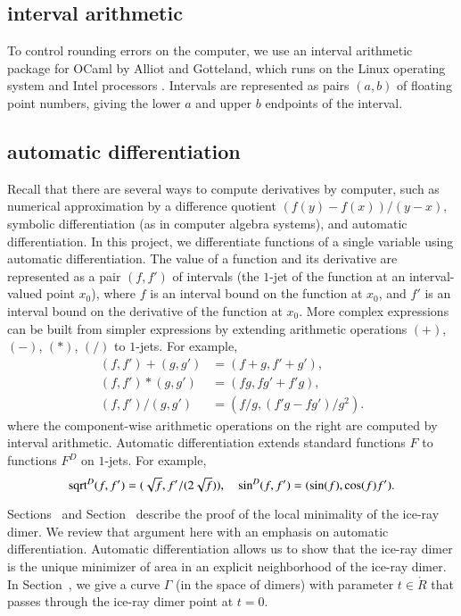 \subsection{interval arithmetic}

To control rounding errors on the computer, we use an interval
arithmetic package for OCaml by Alliot and Gotteland, which runs on
the Linux operating system and Intel processors \cite{All}.  Intervals
are represented as pairs $(a,b)$ of floating point numbers, giving the
lower $a$ and upper $b$ endpoints of the interval.


\subsection{automatic differentiation}

Recall that there are several ways to compute derivatives by computer,
such as numerical approximation by a difference quotient
$(f(y)-f(x))/(y-x)$, symbolic differentiation (as in computer algebra
systems), and automatic differentiation.  In this project, we
differentiate functions of a single variable using automatic
differentiation.  The value of a function and its derivative are
represented as a pair $(f,f')$ of intervals (the $1$-jet of the
function at an interval-valued point $x_0$), where $f$ is an interval
bound on the function at $x_0$, and $f'$ is an interval bound on the
derivative of the function at $x_0$.  More complex expressions can be
built from simpler expressions by extending arithmetic operations
$(+)$, $(-)$, $(*)$, $(/)$ to $1$-jets.  For example,
\begin{align*}
(f,f') + (g,g') &= (f+g,f'+g'),\\
(f,f') * (g,g') &= (f g,f g' + f' g),\\
(f,f') / (g,g') &= (f / g, (f' g - f g')/g^2).
\end{align*}
where the component-wise arithmetic operations on the right are
computed by interval arithmetic.  Automatic differentiation extends
standard functions $F$ to functions $F^D$ on $1$-jets.
For example,
\[
{\operatorname{sqrt}}^D(f,f') = (\sqrt{f}, f'/(2\sqrt{f})),\quad 
\sin^D (f,f') = (\sin(f), \cos(f) f').
\]

Sections~ and Section~ describe
the proof of the local minimality of the ice-ray dimer.  We review
that argument here with an emphasis on automatic differentiation.
Automatic differentiation allows us to show that the ice-ray dimer is
the unique minimizer of area in an explicit neighborhood of the
ice-ray dimer.  In Section~, we give a curve
$\Gamma$ (in the space of dimers) with parameter $t\in\ring{R}$ that
passes through the ice-ray dimer point at $t=0$.

